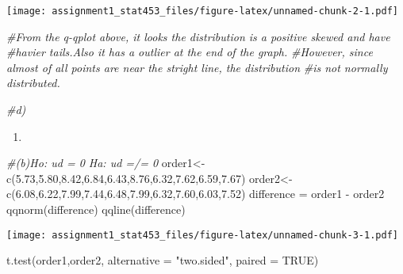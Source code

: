 \documentclass[
]{article}
\newenvironment{Shaded}{\begin{snugshade}}{\end{snugshade}}
\newcommand{\AttributeTok}[1]{\textcolor[rgb]{0.77,0.63,0.00}{#1}}
\newcommand{\CommentTok}[1]{\textcolor[rgb]{0.56,0.35,0.01}{\textit{#1}}}
\newcommand{\ConstantTok}[1]{\textcolor[rgb]{0.00,0.00,0.00}{#1}}
\newcommand{\FloatTok}[1]{\textcolor[rgb]{0.00,0.00,0.81}{#1}}
\newcommand{\FunctionTok}[1]{\textcolor[rgb]{0.00,0.00,0.00}{#1}}
\newcommand{\NormalTok}[1]{#1}
\newcommand{\OtherTok}[1]{\textcolor[rgb]{0.56,0.35,0.01}{#1}}
\newcommand{\SpecialCharTok}[1]{\textcolor[rgb]{0.00,0.00,0.00}{#1}}
\newcommand{\StringTok}[1]{\textcolor[rgb]{0.31,0.60,0.02}{#1}}
\providecommand{\tightlist}{%
  \setlength{\itemsep}{0pt}\setlength{\parskip}{0pt}}
\begin{document}
\texttt{[image: assignment1\_stat453\_files/figure-latex/unnamed-chunk-2-1.pdf]}

\begin{Shaded}
\begin{Highlighting}[]
\CommentTok{\#From the q{-}qplot above, it looks the distribution is a positive skewed and have}
\CommentTok{\#havier tails.Also it has a outlier at the end of the graph. }
\CommentTok{\#However, since almost of all points are near the stright line, the distribution }
\CommentTok{\#is not normally distributed.}

\CommentTok{\#d)}
\end{Highlighting}
\end{Shaded}

\begin{enumerate}
\def\labelenumi{\arabic{enumi})}
\setcounter{enumi}{3}
\tightlist
\item
\end{enumerate}

\begin{Shaded}
\begin{Highlighting}[]
\CommentTok{\#(b)Ho: ud = 0 Ha: ud =/= 0}
\NormalTok{order1}\OtherTok{\textless{}{-}} \FunctionTok{c}\NormalTok{(}\FloatTok{5.73}\NormalTok{,}\FloatTok{5.80}\NormalTok{,}\FloatTok{8.42}\NormalTok{,}\FloatTok{6.84}\NormalTok{,}\FloatTok{6.43}\NormalTok{,}\FloatTok{8.76}\NormalTok{,}\FloatTok{6.32}\NormalTok{,}\FloatTok{7.62}\NormalTok{,}\FloatTok{6.59}\NormalTok{,}\FloatTok{7.67}\NormalTok{)}
\NormalTok{order2}\OtherTok{\textless{}{-}} \FunctionTok{c}\NormalTok{(}\FloatTok{6.08}\NormalTok{,}\FloatTok{6.22}\NormalTok{,}\FloatTok{7.99}\NormalTok{,}\FloatTok{7.44}\NormalTok{,}\FloatTok{6.48}\NormalTok{,}\FloatTok{7.99}\NormalTok{,}\FloatTok{6.32}\NormalTok{,}\FloatTok{7.60}\NormalTok{,}\FloatTok{6.03}\NormalTok{,}\FloatTok{7.52}\NormalTok{)}
\NormalTok{difference }\OtherTok{=}\NormalTok{ order1 }\SpecialCharTok{{-}}\NormalTok{ order2}
\FunctionTok{qqnorm}\NormalTok{(difference)}
\FunctionTok{qqline}\NormalTok{(difference)}
\end{Highlighting}
\end{Shaded}

\texttt{[image: assignment1\_stat453\_files/figure-latex/unnamed-chunk-3-1.pdf]}

\begin{Shaded}
\begin{Highlighting}[]
\FunctionTok{t.test}\NormalTok{(order1,order2, }\AttributeTok{alternative =} \StringTok{"two.sided"}\NormalTok{, }\AttributeTok{paired =} \ConstantTok{TRUE}\NormalTok{)}
\end{Highlighting}
\end{Shaded}
\end{document}
